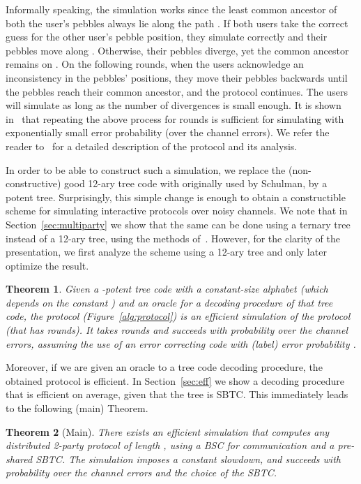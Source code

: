 \documentclass[ letterpaper, 11pt]{article}
\newtheorem{theorem}{Theorem}[section]
\newcommand{\potent}{potent\xspace}
\newcommand{\KTC}{\textsf{SBTC}\xspace}
\begin{document}
Informally speaking, the simulation works since the least common ancestor  of
both the user's pebbles always lie along the path . If both users take the
correct guess for the other user's pebble position, they simulate  correctly and their pebbles move along .
Otherwise, their pebbles diverge, yet the common ancestor remains on .
On the following rounds, when the users acknowledge an inconsistency in the pebbles' positions,
they move their pebbles backwards until the pebbles reach their common ancestor, and
the protocol continues.  The users will simulate  as long as the number of
divergences is small enough.
It is shown in~\cite{schulman96} that repeating the above process for
 rounds is sufficient for simulating
 with exponentially small error probability (over the
channel errors).
We refer the reader to~\cite{schulman96}
for a detailed description of the protocol and its analysis.



In order to be able to construct such
a simulation, we replace the (non-constructive)
good 12-ary tree code with  originally used by Schulman, by a
\potent tree.
Surprisingly, this simple change is enough to obtain a constructible scheme
for simulating interactive protocols over noisy channels.
We note that in Section~\ref{sec:multiparty} we show that the same can be done using a ternary tree
instead of a 12-ary tree, using the methods of~\cite{RS94}. However, for the clarity of the
presentation, we first analyze the scheme using  a 12-ary tree
and only later optimize the result.



\begin{theorem}\label{thm:mainA}
Given a -\potent tree code with a constant-size alphabet 
(which depends on the constant )
and an oracle for a decoding procedure of that tree code,
the protocol  (Figure~\ref{alg:protocol})
is an efficient simulation of the protocol  (that has  rounds).
It takes  rounds and succeeds with probability  over the channel errors,
assuming the use of an error correcting code with (label) error probability .
\end{theorem}

Moreover,
if we are given an oracle to a tree code decoding procedure, the obtained protocol
is efficient. In Section~\ref{sec:eff} we show a decoding procedure
that is efficient  on average, given that the tree is \KTC. This immediately
leads to the following (main) Theorem.

\begin{theorem}[Main]\label{thm:main}
There exists an efficient simulation that computes any distributed 2-party protocol  of length ,
using a BSC for communication and a pre-shared \KTC. The simulation imposes a constant slowdown,
and succeeds with probability  over the channel errors and the choice of the \KTC.
\end{theorem}
\end{document}
